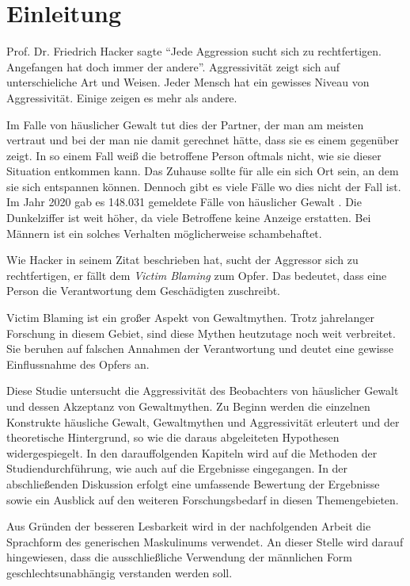 \chapter{Einleitung}   \label{ch_1}
Prof. Dr. Friedrich Hacker sagte \enquote{Jede Aggression sucht sich zu rechtfertigen. Angefangen hat doch immer der andere}. \parencite{Friedrich_Hacker} Aggressivität zeigt sich auf unterschieliche Art und Weisen. Jeder Mensch hat ein gewisses Niveau von Aggressivität. Einige zeigen es mehr als andere. 


Im Falle von häuslicher Gewalt tut dies der Partner, der man am meisten vertraut und 
bei der man nie damit gerechnet hätte, dass sie es einem gegenüber zeigt. In so einem 
Fall weiß die betroffene Person oftmals nicht, wie sie dieser Situation entkommen kann. 
Das Zuhause sollte für alle ein sich Ort sein, an dem sie sich entspannen können. 
Dennoch gibt es viele Fälle wo dies nicht der Fall ist. Im Jahr 2020 gab es 148.031 
gemeldete Fälle von häuslicher Gewalt \parencite{häusliche_Gewalt}. 
Die Dunkelziffer ist weit höher, da viele Betroffene keine Anzeige erstatten. Bei Männern
ist ein solches Verhalten möglicherweise schambehaftet.

Wie Hacker \parencite{Friedrich_Hacker} 
in seinem Zitat beschrieben hat, sucht der Aggressor sich zu rechtfertigen, er fällt
dem \textit{Victim Blaming} zum Opfer. Das bedeutet, dass eine Person die Verantwortung
dem Geschädigten zuschreibt. 

Victim Blaming ist ein großer Aspekt von Gewaltmythen. Trotz jahrelanger Forschung in 
diesem Gebiet, sind diese Mythen heutzutage noch weit verbreitet. 
Sie beruhen auf falschen Annahmen der Verantwortung und deutet eine gewisse Einflussnahme 
des Opfers an.

Diese Studie untersucht die Aggressivität des Beobachters von häuslicher Gewalt und 
dessen Akzeptanz von Gewaltmythen. Zu Beginn werden die einzelnen Konstrukte häusliche 
Gewalt, Gewaltmythen und Aggressivität erleutert und der theoretische Hintergrund, so wie 
die daraus abgeleiteten Hypothesen widergespiegelt. In den darauffolgenden Kapiteln wird 
auf die Methoden der Studiendurchführung, wie auch auf die Ergebnisse eingegangen. In der 
abschließenden Diskussion erfolgt eine umfassende Bewertung der Ergebnisse sowie ein 
Ausblick auf den weiteren Forschungsbedarf in diesen Themengebieten.

Aus Gründen der besseren Lesbarkeit wird in der nachfolgenden Arbeit die Sprachform des
generischen Maskulinums verwendet. An dieser Stelle wird darauf hingewiesen, dass die 
ausschließliche Verwendung der männlichen Form geschlechtsunabhängig verstanden werden 
soll.